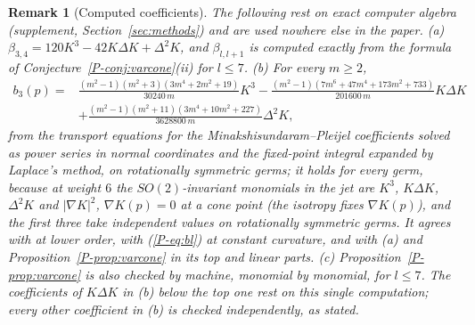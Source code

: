 \documentclass[pdflatex,sn-mathphys-num]{sn-jnl}
\newcommand{\pref}[1]{\ref*{P-#1}}%
\theoremstyle{thmstyleone}%
\theoremstyle{thmstylethree}%
\newtheorem{remark}[proposition]{Remark}%
\begin{document}
\begin{remark}[Computed coefficients]\label{rem:varcomp}
The following rest on exact computer algebra (supplement, Section~\ref{sec:methods}) and are used nowhere else in the paper. (a) $\beta_{3,4}=120K^3-42K\Delta K+\Delta^2K$, and $\beta_{l,l+1}$ is computed exactly from the formula of Conjecture~\pref{conj:varcone}(ii) for $l\le7$. (b) For every $m\ge2$,
\[
\begin{aligned}
b_3(p)={}&\tfrac{(m^2-1)(m^2+3)(3m^4+2m^2+19)}{30240\,m}K^3
-\tfrac{(m^2-1)(7m^6+47m^4+173m^2+733)}{201600\,m}K\Delta K\\
&+\tfrac{(m^2-1)(m^2+11)(3m^4+10m^2+227)}{3628800\,m}\Delta^2K ,
\end{aligned}
\]
from the transport equations for the Minakshisundaram--Pleijel coefficients solved as power series in normal coordinates and the fixed-point integral expanded by Laplace's method, on rotationally symmetric germs; it holds for every germ, because at weight $6$ the $SO(2)$-invariant monomials in the jet are $K^3$, $K\Delta K$, $\Delta^2K$ and $|\nabla K|^2$, $\nabla K(p)=0$ at a cone point (the isotropy fixes $\nabla K(p)$), and the first three take independent values on rotationally symmetric germs. It agrees with \cite[Rem.~3.2, Thm~3.7, Thm~4.1]{schueth2019} at lower order, with (\pref{eq:bl}) at constant curvature, and with (a) and Proposition~\pref{prop:varcone} in its top and linear parts. (c) Proposition~\pref{prop:varcone} is also checked by machine, monomial by monomial, for $l\le7$. The coefficients of $K\Delta K$ in (b) below the top one rest on this single computation; every other coefficient in (b) is checked independently, as stated.
\end{remark}
\end{document}
